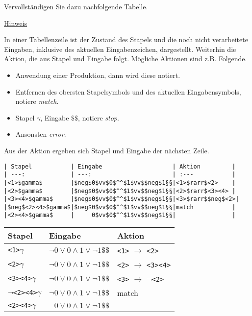 \documentclass{uebungsblatt}
\begin{document}
\begin{aufgabe}
\begin{enumerate}
Vervollständigen Sie dazu nachfolgende Tabelle.\\

\underline{Hinweis}

In einer Tabellenzeile ist der Zustand des Stapels und die
noch nicht verarbeitete Eingaben, inklusive des aktuellen Eingabenzeichen,
dargestellt. Weiterhin die Aktion, die aus Stapel und Eingabe folgt.
Mögliche Aktionen sind z.B. Folgende.
\begin{itemize}
\item Anwendung einer Produktion, dann wird diese notiert.
\item Entfernen des obersten Stapelsymbols und des aktuellen Eingabensymbols, notiere \textit{match}.
\item Stapel $\gamma$, Eingabe $\$\$$, notiere \textit{stop}.
\item Ansonsten \textit{error}.
\end{itemize}

Aus der Aktion ergeben sich Stapel und Eingabe der nächsten Zeile.

\end{enumerate}

\bigskip
\begin{cut}
\markdown
\begin{lstlisting}[basicstyle=\ttfamily\footnotesize]
| Stapel           | Eingabe                    | Aktion         |
| ---:             | ---:                       | :---           | 
|<1>$gamma$        |$neg$0$vv$0$^^$1$vv$$neg$1§§|<1>$rarr$<2>    |
|<2>$gamma$        |$neg$0$vv$0$^^$1$vv$$neg$1§§|<2>$rarr$<3><4> |
|<3><4>$gamma$     |$neg$0$vv$0$^^$1$vv$$neg$1§§|<3>$rarr$$neg$<2>|
|$neg$<2><4>$gamma$|$neg$0$vv$0$^^$1$vv$$neg$1§§|match           |
|<2><4>$gamma$     |     0$vv$0$^^$1$vv$$neg$1§§|                |
\end{lstlisting}
\end{cut}

\begin{center}
            \begin{tabular}{l|r|l}
    		Stapel & \multicolumn{1}{l|}{Eingabe} & Aktion \\
    		\hline
    		\verb|<1>|$\gamma$ & $\neg 0 \lor 0 \land 1 \lor \neg 1 \$\$ $ & \verb|<1>| $\rightarrow$ \verb|<2>| \\
    		\verb|<2>|$\gamma$ & $\neg 0 \lor 0 \land 1 \lor \neg 1 \$\$ $ & \verb|<2>| $\rightarrow$ \verb|<3><4>|\\
    		\verb|<3><4>|$\gamma$ & $\neg 0 \lor 0 \land 1 \lor \neg 1 \$\$ $& \verb|<3>| $\rightarrow$ $\neg$\verb|<2>|\\
    		$\neg$\verb|<2><4>|$\gamma$ & $\neg 0 \lor 0 \land 1 \lor \neg 1 \$\$ $ & match\\
    	    \verb|<2><4>|$\gamma$ & $0 \lor 0 \land 1 \lor \neg 1 \$\$ $ & \\
    	    \end{tabular}
\end{center}
\end{aufgabe}
\end{document}
